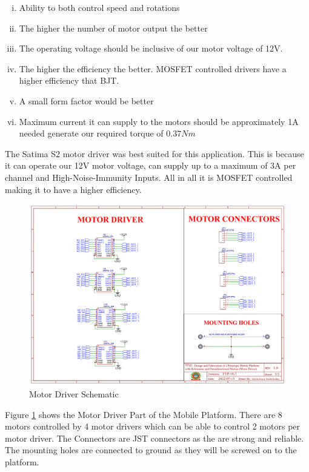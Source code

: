 \begin{enumerate}[i.]
    \item Ability to both control speed and rotations
    \item The higher the number of motor output the better
    \item The operating voltage should be inclusive of our motor voltage of 12V.
    \item The higher the efficiency the better. \ac{MOSFET} controlled drivers have a higher efficiency that \ac{BJT}.
    \item A small form factor would be better
    \item Maximum current it can supply to the motors should be approximately 1A needed generate our required torque of $0.37 N m$
\end{enumerate}
The Satima S2 motor driver was best suited for this application. This is because it can operate our 12V motor voltage, can supply up to a maximum of 3A per channel and High-Noise-Immunity Inputs. All in all it is \ac{MOSFET} controlled making it to have a higher efficiency.

\begin{figure}[H]
    \centering
    \includegraphics[scale=0.4]{Figures/MPmotorDriver.png}
    \caption{Motor Driver Schematic}
    \label{fig:motordriverschematic}
\end{figure}

Figure \ref{fig:motordriverschematic} shows the Motor Driver Part of the Mobile Platform. There are 8 motors controlled by 4 motor drivers which can be able to control 2 motors per motor driver. The Connectors are JST connectors as the are strong and reliable.
The mounting holes are connected to ground as they will be screwed on to the platform.

